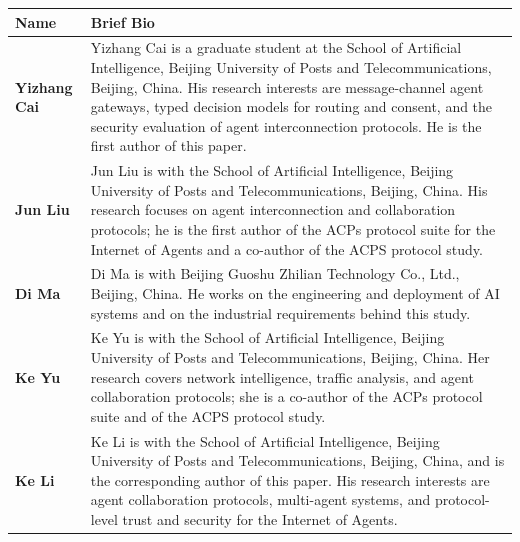 \documentclass[11pt,a4paper]{article}
\begin{document}
\begin{longtable}{@{}p{3.4cm}p{10.8cm}@{}}
\hline
\textbf{Name} & \textbf{Brief Bio} \\[0.3em]
\hline
\endhead
{\bfseries Yizhang Cai} & {\footnotesize Yizhang Cai is a graduate student at the School of Artificial Intelligence, Beijing University of Posts and Telecommunications, Beijing, China. His research interests are message-channel agent gateways, typed decision models for routing and consent, and the security evaluation of agent interconnection protocols. He is the first author of this paper.} \\[0.4em] \hline
{\bfseries Jun Liu} & {\footnotesize Jun Liu is with the School of Artificial Intelligence, Beijing University of Posts and Telecommunications, Beijing, China. His research focuses on agent interconnection and collaboration protocols; he is the first author of the ACPs protocol suite for the Internet of Agents and a co-author of the ACPS protocol study. } \\[0.4em] \hline
{\bfseries Di Ma} & {\footnotesize Di Ma is with Beijing Guoshu Zhilian Technology Co., Ltd., Beijing, China. He works on the engineering and deployment of AI systems and on the industrial requirements behind this study.} \\[0.4em] \hline
{\bfseries Ke Yu} & {\footnotesize Ke Yu is with the School of Artificial Intelligence, Beijing University of Posts and Telecommunications, Beijing, China. Her research covers network intelligence, traffic analysis, and agent collaboration protocols; she is a co-author of the ACPs protocol suite and of the ACPS protocol study.} \\[0.4em] \hline
{\bfseries Ke Li} & {\footnotesize Ke Li is with the School of Artificial Intelligence, Beijing University of Posts and Telecommunications, Beijing, China, and is the corresponding author of this paper. His research interests are agent collaboration protocols, multi-agent systems, and protocol-level trust and security for the Internet of Agents.} \\[0.4em] \hline
\end{longtable}
\end{document}
